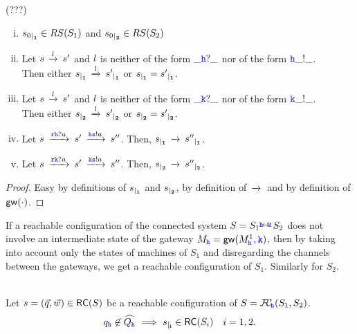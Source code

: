 \begin{lemma} (???) \hfill
\label{lem:indrestrict}  
\begin{enumerate}[i)]
\item
$\restrict{s_0}{1}\in RS(S_1)$ and  $\restrict{s_0}{2}\in RS(S_2)$
\item
Let $s\lts{\elle}s'$ 
and $\elle$ is neither of the form $\_\HH?\_$ nor of the form $\HH\_!\_$.\\
Then either $\restrict{s}{1}\lts{\elle}\restrict{s'}{1}$ or  $\restrict{s}{1}=\restrict{s'}{1}$.
\item
Let $s\lts{\elle}s'$ 
and $\elle$ is neither of the form $\_\KK?\_$ nor of the form $\KK\_!\_$.\\
Then either $\restrict{s}{2}\lts{\elle}\restrict{s'}{2}$ or  $\restrict{s}{2}=\restrict{s'}{2}$.
\item
Let $s\lts{\ttr\HH?a} s'\lts{\HH\tts!a} s''$.
Then, $\restrict{s}{1}\lts{}\restrict{s''}{1}$.
\item
Let $s\lts{\ttr\KK?a} s'\lts{\KK\tts!a} s''$.
Then, $\restrict{s}{2}\lts{}\restrict{s''}{2}$.
\end{enumerate}
\end{lemma}

\begin{proof}
Easy by definitions of $\restrict{s}{1}$ and $\restrict{s}{2}$, by definition of $\lts{}$ and by definition of 
$\gateway{\cdot}$.
\end{proof}



If a reachable configuration of the connected system $S={S_{1}}\connect{\HH}{\KK} {S_{2}}$ does not involve an intermediate state of the gateway
$M_\HH = \gateway{M^1_\HH, \KK}$, %
then by taking into account only the states of machines of $S_1$ and disregarding
the channels between the gateways, %
we get a
reachable configuration of $S_1$. Similarly for $S_2$.

\begin{lemma}
\label{lem:nohatrestrict}\hfill\\
Let $s= (\vec{q},\vec{w}) \in \RS(S)$ be a reachable configuration of 
$S =\fusioncomp_{\!\hh}(S_1,S_2)$.
$${q}_\HH\not\in\widehat{Q_\hh} \implies 
\restrict{s}{i}\in \RS(S_i) \quad i=1,2.$$
\end{lemma}

